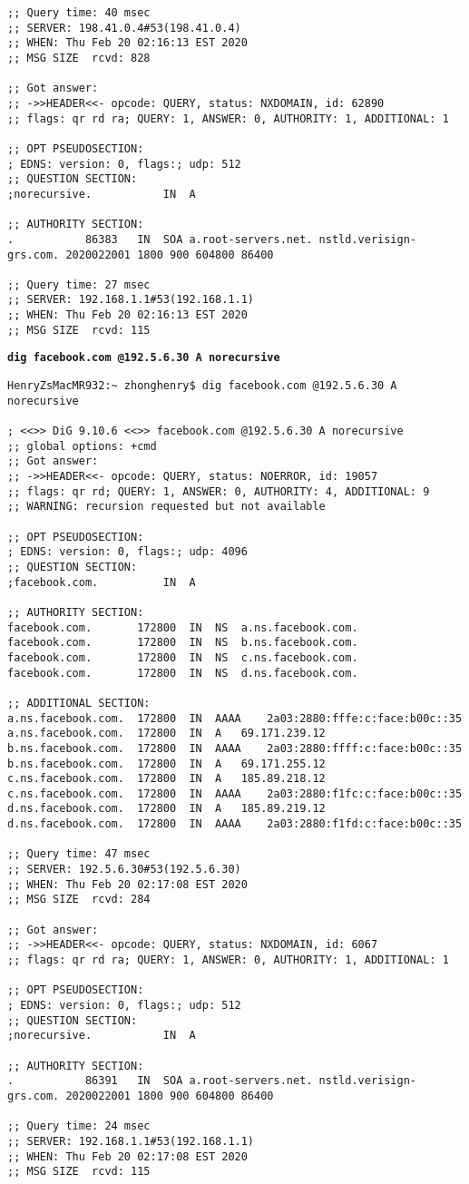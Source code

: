 \documentclass[12pt]{article}
\newcommand{\ilc}{\texttt}
\begin{document}
\begin{verbatim}
;; Query time: 40 msec
;; SERVER: 198.41.0.4#53(198.41.0.4)
;; WHEN: Thu Feb 20 02:16:13 EST 2020
;; MSG SIZE  rcvd: 828

;; Got answer:
;; ->>HEADER<<- opcode: QUERY, status: NXDOMAIN, id: 62890
;; flags: qr rd ra; QUERY: 1, ANSWER: 0, AUTHORITY: 1, ADDITIONAL: 1

;; OPT PSEUDOSECTION:
; EDNS: version: 0, flags:; udp: 512
;; QUESTION SECTION:
;norecursive.			IN	A

;; AUTHORITY SECTION:
.			86383	IN	SOA	a.root-servers.net. nstld.verisign-grs.com. 2020022001 1800 900 604800 86400

;; Query time: 27 msec
;; SERVER: 192.168.1.1#53(192.168.1.1)
;; WHEN: Thu Feb 20 02:16:13 EST 2020
;; MSG SIZE  rcvd: 115
\end{verbatim}

\textbf{\ilc{dig facebook.com @192.5.6.30 A norecursive}}
\begin{verbatim}
HenryZsMacMR932:~ zhonghenry$ dig facebook.com @192.5.6.30 A norecursive

; <<>> DiG 9.10.6 <<>> facebook.com @192.5.6.30 A norecursive
;; global options: +cmd
;; Got answer:
;; ->>HEADER<<- opcode: QUERY, status: NOERROR, id: 19057
;; flags: qr rd; QUERY: 1, ANSWER: 0, AUTHORITY: 4, ADDITIONAL: 9
;; WARNING: recursion requested but not available

;; OPT PSEUDOSECTION:
; EDNS: version: 0, flags:; udp: 4096
;; QUESTION SECTION:
;facebook.com.			IN	A

;; AUTHORITY SECTION:
facebook.com.		172800	IN	NS	a.ns.facebook.com.
facebook.com.		172800	IN	NS	b.ns.facebook.com.
facebook.com.		172800	IN	NS	c.ns.facebook.com.
facebook.com.		172800	IN	NS	d.ns.facebook.com.

;; ADDITIONAL SECTION:
a.ns.facebook.com.	172800	IN	AAAA	2a03:2880:fffe:c:face:b00c::35
a.ns.facebook.com.	172800	IN	A	69.171.239.12
b.ns.facebook.com.	172800	IN	AAAA	2a03:2880:ffff:c:face:b00c::35
b.ns.facebook.com.	172800	IN	A	69.171.255.12
c.ns.facebook.com.	172800	IN	A	185.89.218.12
c.ns.facebook.com.	172800	IN	AAAA	2a03:2880:f1fc:c:face:b00c::35
d.ns.facebook.com.	172800	IN	A	185.89.219.12
d.ns.facebook.com.	172800	IN	AAAA	2a03:2880:f1fd:c:face:b00c::35

;; Query time: 47 msec
;; SERVER: 192.5.6.30#53(192.5.6.30)
;; WHEN: Thu Feb 20 02:17:08 EST 2020
;; MSG SIZE  rcvd: 284

;; Got answer:
;; ->>HEADER<<- opcode: QUERY, status: NXDOMAIN, id: 6067
;; flags: qr rd ra; QUERY: 1, ANSWER: 0, AUTHORITY: 1, ADDITIONAL: 1

;; OPT PSEUDOSECTION:
; EDNS: version: 0, flags:; udp: 512
;; QUESTION SECTION:
;norecursive.			IN	A

;; AUTHORITY SECTION:
.			86391	IN	SOA	a.root-servers.net. nstld.verisign-grs.com. 2020022001 1800 900 604800 86400

;; Query time: 24 msec
;; SERVER: 192.168.1.1#53(192.168.1.1)
;; WHEN: Thu Feb 20 02:17:08 EST 2020
;; MSG SIZE  rcvd: 115
\end{verbatim}
\end{document}
